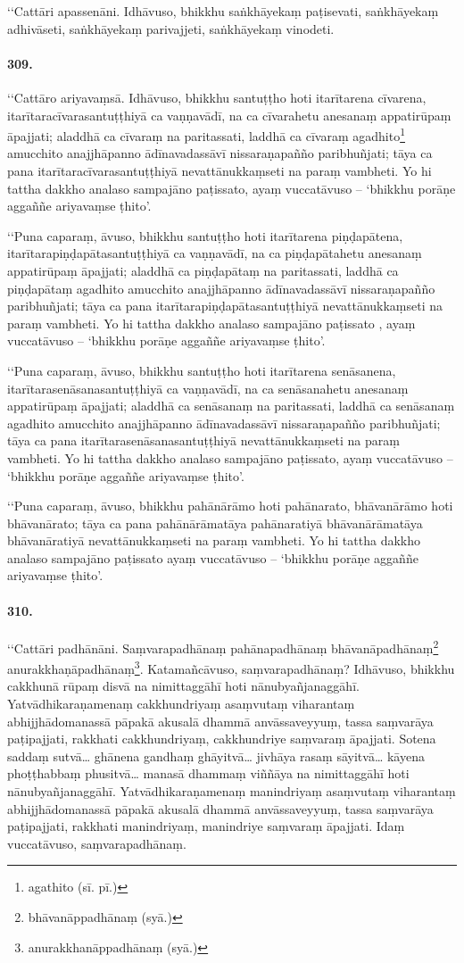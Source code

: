 ‘‘Cattāri apassenāni. Idhāvuso, bhikkhu saṅkhāyekaṃ paṭisevati, saṅkhāyekaṃ adhivāseti, saṅkhāyekaṃ parivajjeti, saṅkhāyekaṃ vinodeti.

\paragraph{309.} ‘‘Cattāro ariyavaṃsā. Idhāvuso, bhikkhu santuṭṭho hoti itarītarena cīvarena, itarītaracīvarasantuṭṭhiyā ca vaṇṇavādī, na ca cīvarahetu anesanaṃ appatirūpaṃ āpajjati; aladdhā ca cīvaraṃ na paritassati, laddhā ca cīvaraṃ agadhito\footnote{agathito (sī. pī.)} amucchito anajjhāpanno ādīnavadassāvī nissaraṇapañño paribhuñjati; tāya ca pana itarītaracīvarasantuṭṭhiyā nevattānukkaṃseti na paraṃ vambheti. Yo hi tattha dakkho analaso sampajāno paṭissato, ayaṃ vuccatāvuso – ‘bhikkhu porāṇe aggaññe ariyavaṃse ṭhito’.

‘‘Puna caparaṃ, āvuso, bhikkhu santuṭṭho hoti itarītarena piṇḍapātena, itarītarapiṇḍapātasantuṭṭhiyā ca vaṇṇavādī, na ca piṇḍapātahetu anesanaṃ appatirūpaṃ āpajjati; aladdhā ca piṇḍapātaṃ na paritassati, laddhā ca piṇḍapātaṃ agadhito amucchito anajjhāpanno ādīnavadassāvī nissaraṇapañño paribhuñjati; tāya ca pana itarītarapiṇḍapātasantuṭṭhiyā nevattānukkaṃseti na paraṃ vambheti. Yo hi tattha dakkho analaso sampajāno paṭissato , ayaṃ vuccatāvuso – ‘bhikkhu porāṇe aggaññe ariyavaṃse ṭhito’.

‘‘Puna caparaṃ, āvuso, bhikkhu santuṭṭho hoti itarītarena senāsanena, itarītarasenāsanasantuṭṭhiyā ca vaṇṇavādī, na ca senāsanahetu anesanaṃ appatirūpaṃ āpajjati; aladdhā ca senāsanaṃ na paritassati, laddhā ca senāsanaṃ agadhito amucchito anajjhāpanno ādīnavadassāvī nissaraṇapañño paribhuñjati; tāya ca pana itarītarasenāsanasantuṭṭhiyā nevattānukkaṃseti na paraṃ vambheti. Yo hi tattha dakkho analaso sampajāno paṭissato, ayaṃ vuccatāvuso – ‘bhikkhu porāṇe aggaññe ariyavaṃse ṭhito’.

‘‘Puna caparaṃ, āvuso, bhikkhu pahānārāmo hoti pahānarato, bhāvanārāmo hoti bhāvanārato; tāya ca pana pahānārāmatāya pahānaratiyā bhāvanārāmatāya bhāvanāratiyā nevattānukkaṃseti na paraṃ vambheti. Yo hi tattha dakkho analaso sampajāno paṭissato ayaṃ vuccatāvuso – ‘bhikkhu porāṇe aggaññe ariyavaṃse ṭhito’.

\paragraph{310.} ‘‘Cattāri padhānāni. Saṃvarapadhānaṃ pahānapadhānaṃ bhāvanāpadhānaṃ\footnote{bhāvanāppadhānaṃ (syā.)} anurakkhaṇāpadhānaṃ\footnote{anurakkhanāppadhānaṃ (syā.)}. Katamañcāvuso, saṃvarapadhānaṃ? Idhāvuso, bhikkhu cakkhunā rūpaṃ disvā na nimittaggāhī hoti nānubyañjanaggāhī. Yatvādhikaraṇamenaṃ cakkhundriyaṃ asaṃvutaṃ viharantaṃ abhijjhādomanassā pāpakā akusalā dhammā anvāssaveyyuṃ, tassa saṃvarāya paṭipajjati, rakkhati cakkhundriyaṃ, cakkhundriye saṃvaraṃ āpajjati. Sotena saddaṃ sutvā… ghānena gandhaṃ ghāyitvā… jivhāya rasaṃ sāyitvā… kāyena phoṭṭhabbaṃ phusitvā… manasā dhammaṃ viññāya na nimittaggāhī hoti nānubyañjanaggāhī. Yatvādhikaraṇamenaṃ manindriyaṃ asaṃvutaṃ viharantaṃ abhijjhādomanassā pāpakā akusalā dhammā anvāssaveyyuṃ, tassa saṃvarāya paṭipajjati, rakkhati manindriyaṃ, manindriye saṃvaraṃ āpajjati. Idaṃ vuccatāvuso, saṃvarapadhānaṃ.

